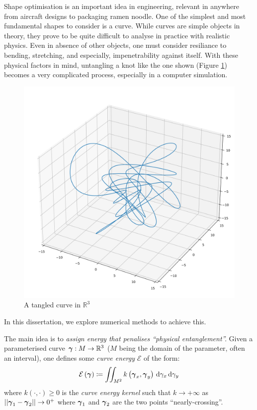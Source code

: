 \documentclass[../dissertation.tex]{subfiles}
\begin{document}
Shape optimisation is an important idea in engineering, relevant in anywhere from aircraft designs to packaging ramen noodle.
One of the simplest and most fundamental shapes to consider is a curve.
While curves are simple objects in theory, they prove to be quite difficult to analyse in practice with realistic physics.
Even in absence of other objects, one must consider resiliance to bending, stretching, and especially, impenetrability against itself.
With these physical factors in mind, untangling a knot like the one shown (Figure \ref{fig: Knot}) becomes a very complicated process,
especially in a computer simulation.
\begin{figure}[tpb]
    \centering
    \includegraphics[scale=0.3]{sections/introductionImgs/knot}
    \caption{A tangled curve in $\mathbb{R}^3$}
    \label{fig: Knot}
\end{figure}
In this dissertation, we explore numerical methods to achieve this.

The main idea is to \emph{assign energy that penalises ``physical entanglement''.}
Given a parameterised curve $\boldsymbol{\gamma}:M \rightarrow \mathbb{R}^3$ ($M$ being the domain of the parameter, often an interval),
one defines some \emph{curve energy} $\mathcal{E}$ of the form:
\begin{equation}
    \mathcal{E} \left( \boldsymbol{\gamma} \right) \coloneqq \iint_{M^2} k\left( \boldsymbol{\gamma}_x, \boldsymbol{\gamma}_y \right) \, \text{d} \gamma_x \, \text{d} \gamma_y
\end{equation}
where $k\left( \cdot , \cdot \right) \geq 0$ is the \emph{curve energy kernel} such that $k \rightarrow +\infty$ as $\lvert \lvert \boldsymbol{\gamma}_1 - \boldsymbol{\gamma}_2 \rvert \rvert \rightarrow 0^+$ where $\boldsymbol{\gamma}_1$ and $\boldsymbol{\gamma}_2$ are the two points ``nearly-crossing''.
\end{document}
